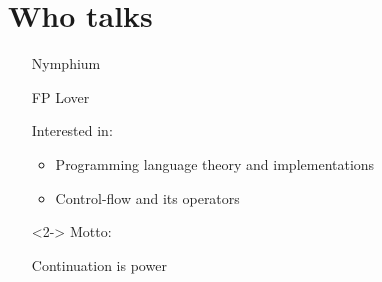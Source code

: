 \section{Who talks}

\begin{frame}
  \frametitlesec

  \begin{itemize}
    \item[\emoji{office}]
    \item[\textcolor{gray}{\faicon{paperclip}}] {\small
        \href{https://twitter.com/Nymphium}{\textcolor{blue!60!white}{}}
        \href{https://github.com/Nymphium}{\textcolor{black}{}}
      Nymphium}
    \item[\emoji{heart}] FP Lover
    \item[\emoji{nerd-face}] Interested in:
      {\small %
        \begin{itemize}
          \item Programming language theory and implementations
          \item Control-flow and its operators
        \end{itemize}}

    \item[\emoji{flexed-biceps}]<2-> Motto:

      \begin{center}
        \hspace{-2\zw}%
        \Large\boldslant Continuation is power
      \end{center}

  \end{itemize}


\end{frame}
